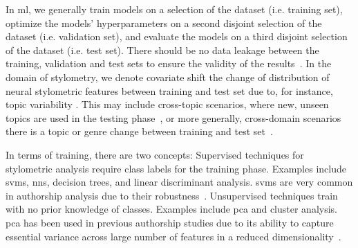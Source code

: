 In \ac{ml}, we generally train models on a selection of the dataset (i.e. training set), optimize the models' hyperparameters on a second disjoint selection of the dataset (i.e. validation set), and evaluate the models on a third disjoint selection of the dataset (i.e. test set).
There should be no data leakage between the training, validation and test sets to ensure the validity of the results~\citep{bischoff_importance_2020,altakrori_topic_2021,boenninghoff_o2d2_2021}.
In the domain of stylometry, we denote covariate shift the change of distribution of neural stylometric features between training and test set due to, for instance, topic variability \citep{boenninghoff_o2d2_2021}.
This may include cross-topic scenarios, where new, unseen topics are used in the testing phase~\citep{altakrori_topic_2021}, or more generally, cross-domain scenarios there is a topic or genre change between training and test set~\citep{barlas_cross_domain_2020}.

In terms of training, there are two concepts:
Supervised techniques for stylometric analysis require class labels for the training phase.
Examples include \acp{svm}, \acp{nn}, decision trees, and linear discriminant analysis.
\acp{svm} are very common in authorship analysis due to their robustness~\citep{abbasi_writeprints_2008}.
Unsupervised techniques train with no prior knowledge of classes.
Examples include \ac{pca} and cluster analysis.
\ac{pca} has been used in previous authorship studies due to its ability to capture essential variance across large number of features in a reduced dimensionality~\citep{abbasi_writeprints_2008}.

